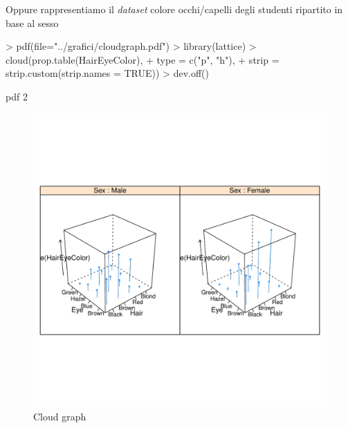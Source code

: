 \documentclass[onecolumn,11pt]{book}
\begin{document}
Oppure rappresentiamo il \emph{dataset} colore occhi/capelli degli studenti ripartito in base al sesso
\begin{Schunk}
\begin{Sinput}
> pdf(file="../grafici/cloudgraph.pdf")
> library(lattice)
> cloud(prop.table(HairEyeColor),
+ type = c("p", "h"),
+ strip = strip.custom(strip.names = TRUE))
> dev.off()
\end{Sinput}
\begin{Soutput}
pdf 
  2 
\end{Soutput}
\end{Schunk}
\begin{figure}[htbp]
\begin{center}
\includegraphics[scale=0.8]{../grafici/cloudgraph.pdf}
\caption{Cloud graph}
\label{default}
\end{center}
\end{figure} 
\end{document}
